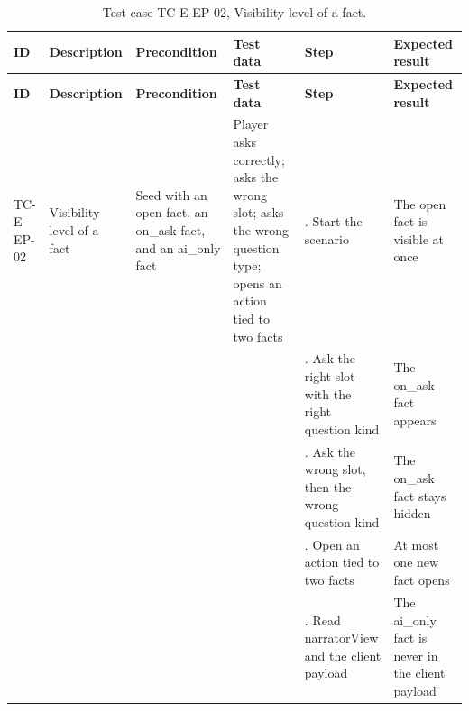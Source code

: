 {\footnotesize{}\renewcommand{\arraystretch}{1.1}
\begin{longtable}{|>{\raggedright\arraybackslash}p{}|>{\raggedright\arraybackslash}p{}|>{\raggedright\arraybackslash}p{}|>{\raggedright\arraybackslash}p{}|>{\raggedright\arraybackslash}p{}|>{\raggedright\arraybackslash}p{}|}
\caption{Test case TC-E-EP-02, Visibility level of a fact.} \\
\hline
\textbf{ID} & \textbf{Description} & \textbf{Precondition} & \textbf{Test data} & \textbf{Step} & \textbf{Expected result} \\ \hline
\endfirsthead
\hline
\textbf{ID} & \textbf{Description} & \textbf{Precondition} & \textbf{Test data} & \textbf{Step} & \textbf{Expected result} \\ \hline
\endhead
TC-E-EP-02 & Visibility level of a fact & Seed with an open fact, an on\_ask fact, and an ai\_only fact & Player asks correctly; asks the wrong slot; asks the wrong question type; opens an action tied to two facts & 1. Start the scenario & The open fact is visible at once \\ \cline{5-6}
 &  &  &  & 2. Ask the right slot with the right question kind & The on\_ask fact appears \\ \cline{5-6}
 &  &  &  & 3. Ask the wrong slot, then the wrong question kind & The on\_ask fact stays hidden \\ \cline{5-6}
 &  &  &  & 4. Open an action tied to two facts & At most one new fact opens \\ \cline{5-6}
 &  &  &  & 5. Read narratorView and the client payload & The ai\_only fact is never in the client payload \\ \hline
\end{longtable}
}


